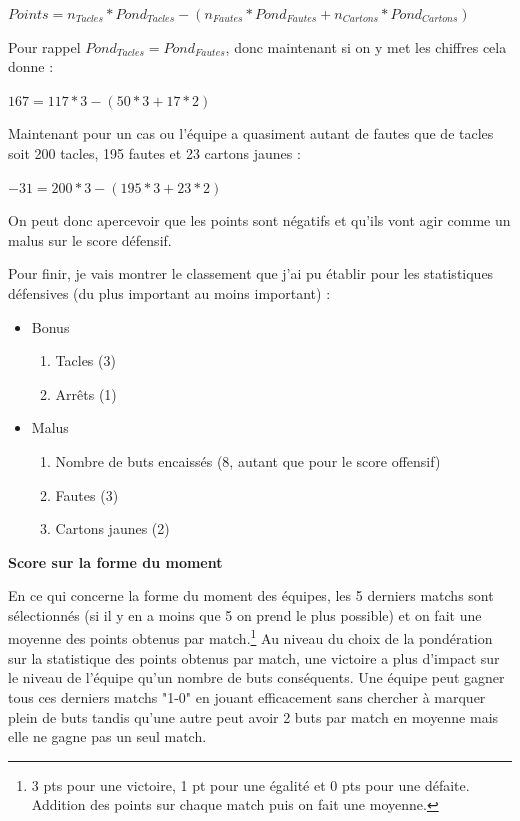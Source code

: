 \documentclass[a4paper,14pt]{extarticle}
\begin{document}
{$Points = n_{Tacles} * Pond_{Tacles} - (n_{Fautes} * Pond_{Fautes} + n_{Cartons} * Pond_{Cartons})$ 


Pour rappel $Pond_{Tacles}=Pond_{Fautes}$, donc maintenant si on y met les chiffres cela donne : 

$167 = 117 * 3 - (50 * 3 + 17 * 2)$

Maintenant pour un cas ou l'équipe a quasiment autant de fautes que de tacles soit 200 tacles, 195 fautes et 23 cartons jaunes : 

$-31 = 200 * 3 - (195 * 3 + 23 * 2)$

On peut donc apercevoir que les points sont négatifs et qu'ils vont agir comme un malus sur le score défensif.

Pour finir, je vais montrer le classement que j'ai pu établir pour les statistiques défensives (du plus important au moins important) :
\begin{itemize}
    \item Bonus
    \begin{enumerate}
        \item Tacles (3)
        \item Arrêts (1)
    \end{enumerate}
    \item Malus
    \begin{enumerate}
        \item Nombre de buts encaissés (8, autant que pour le score offensif)
        \item Fautes (3)
        \item Cartons jaunes (2)
    \end{enumerate}
\end{itemize}

\noindent\textbf{Score sur la forme du moment}

En ce qui concerne la forme du moment des équipes, les 5 derniers matchs sont sélectionnés (si il y en a moins que 5 on prend le plus possible) et on fait une moyenne des points obtenus par match.\footnote{3 pts pour une victoire, 1 pt pour une égalité et 0 pts pour une défaite. Addition des points sur chaque match puis on fait une moyenne.} 
Au niveau du choix de la pondération sur la statistique des points obtenus par match, une victoire a plus d'impact sur le niveau de l'équipe qu'un nombre de buts conséquents. Une équipe peut gagner tous ces derniers matchs "1-0" en jouant efficacement sans chercher à marquer plein de buts tandis qu'une autre peut avoir 2 buts par match en moyenne mais elle ne gagne pas un seul match.

}
\end{document}
